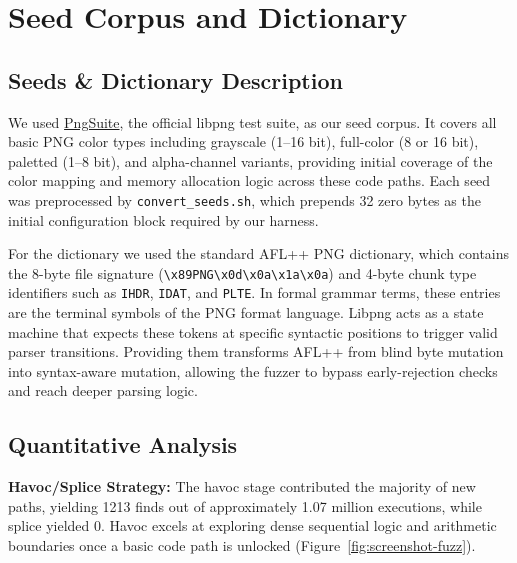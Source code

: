 \documentclass[letterpaper,twocolumn,10pt]{article}
\begin{document}
\section{Seed Corpus and Dictionary}
\label{sec:q3}
\subsection{Seeds \& Dictionary Description}

We used \href{https://github.com/pnggroup/libpng/tree/libpng16/contrib/pngsuite}{PngSuite}, the official libpng test suite, as our seed corpus. It covers all basic PNG color types including grayscale (1--16 bit), full-color (8 or 16 bit), paletted (1--8 bit), and alpha-channel variants, providing initial coverage of the color mapping and memory allocation logic across these code paths.
Each seed was preprocessed by \lstinline|convert_seeds.sh|, which prepends 32 zero bytes as the initial configuration block required by our harness.

For the dictionary we used the standard AFL++ PNG dictionary, which contains the 8-byte file signature (\lstinline|\x89PNG\x0d\x0a\x1a\x0a|) and 4-byte chunk type identifiers such as \lstinline|IHDR|, \lstinline|IDAT|, and
\lstinline|PLTE|. In formal grammar terms, these entries are the terminal symbols of the PNG format language. Libpng acts as a state machine that expects these tokens at specific syntactic positions to trigger valid parser transitions. Providing them transforms AFL++ from blind byte mutation into syntax-aware mutation, allowing the fuzzer to bypass early-rejection checks
and reach deeper parsing logic.

\subsection{Quantitative Analysis}

\textbf{Havoc/Splice Strategy:} The havoc stage contributed the majority of new paths, yielding 1213 finds out of approximately 1.07 million executions,
while splice yielded 0. Havoc excels at exploring dense sequential logic and arithmetic boundaries once a basic code path is unlocked (Figure~\ref{fig:screenshot-fuzz}).
\end{document}
